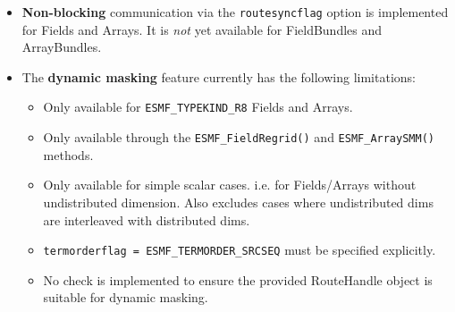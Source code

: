 
\begin{itemize}

\item {\bf Non-blocking} communication via the {\tt routesyncflag} option is implemented for Fields and Arrays. It is {\em not} yet available for FieldBundles and ArrayBundles.

\item The {\bf dynamic masking} feature currently has the following limitations:

\begin{itemize}

\item Only available for {\tt ESMF\_TYPEKIND\_R8} Fields and Arrays.

\item Only available through the {\tt ESMF\_FieldRegrid()} and {\tt ESMF\_ArraySMM()} methods.

\item Only available for simple scalar cases. i.e. for Fields/Arrays without undistributed dimension. Also excludes cases where undistributed dims are interleaved with distributed dims.

\item {\tt termorderflag = ESMF\_TERMORDER\_SRCSEQ} must be specified explicitly.

\item No check is implemented to ensure the provided RouteHandle object is suitable for dynamic masking.

\end{itemize}


\end{itemize}
